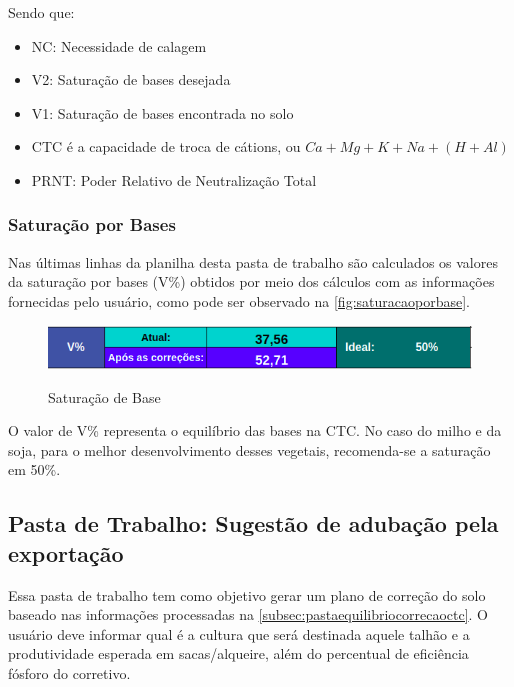 Sendo que:
\begin{itemize}
    \item NC: Necessidade de calagem
    \item V2: Saturação de bases desejada
    \item V1: Saturação de bases encontrada no solo
    \item CTC é a capacidade de troca de cátions, ou \(Ca + Mg + K + Na + (H + Al)\)
    \item PRNT: Poder Relativo de Neutralização Total
\end{itemize}

\subsubsection{Saturação por Bases}
\label{subsubsec:resultadosaturacao}

Nas últimas linhas da planilha desta pasta de trabalho são calculados os valores da saturação por bases (V\%) obtidos por meio dos cálculos com as informações fornecidas pelo usuário, como pode ser observado na \autoref{fig:saturacaoporbase}.

\begin{figure}[H]
    \centering
    \caption{Saturação de Base}
    \includegraphics[width=13cm]{./dados/figuras/planilha/corr_saturacao.png}
    \label{fig:saturacaoporbase}
\end{figure}

O valor de V\% representa o equilíbrio das bases na CTC. No caso do milho e da soja, para o melhor desenvolvimento desses vegetais, recomenda-se a saturação em 50\%.

\subsection{Pasta de Trabalho: Sugestão de adubação pela exportação}
\label{subsec:sugestaoadubacao}

Essa pasta de trabalho tem como objetivo gerar um plano de correção do solo baseado nas informações processadas na \autoref{subsec:pastaequilibriocorrecaoctc}. O usuário deve informar qual é a cultura que será destinada aquele talhão e a produtividade esperada em sacas/alqueire, além do percentual de eficiência fósforo do corretivo.

